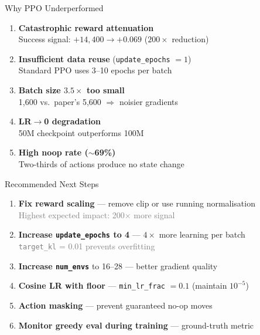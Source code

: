 \documentclass[aspectratio=169,11pt]{beamer}
\begin{document}
\begin{frame}{Why PPO Underperformed}
  \begin{enumerate}
    \item \textbf{Catastrophic reward attenuation}\\
      Success signal: $+14{,}400 \to +0.069$ ($200\times$ reduction)

    \item \textbf{Insufficient data reuse} (\texttt{update\_epochs} $= 1$)\\
      Standard PPO uses 3--10 epochs per batch

    \item \textbf{Batch size $3.5\times$ too small}\\
      1{,}600 vs.\ paper's 5{,}600 $\Rightarrow$ noisier gradients

    \item \textbf{LR$\to$0 degradation}\\
      50M checkpoint outperforms 100M

    \item \textbf{High noop rate ($\sim$69\%)}\\
      Two-thirds of actions produce no state change
  \end{enumerate}
\end{frame}

\begin{frame}{Recommended Next Steps}
  \begin{enumerate}
    \item \textcolor{accent}{\textbf{Fix reward scaling}}
      --- remove clip or use running normalisation\\
      {\small\textcolor{gray}{Highest expected impact: 200$\times$ more signal}}

    \item \textbf{Increase \texttt{update\_epochs} to 4}
      --- $4\times$ more learning per batch\\
      {\small\textcolor{gray}{\texttt{target\_kl} = 0.01 prevents overfitting}}

    \item \textbf{Increase \texttt{num\_envs}} to 16--28
      --- better gradient quality

    \item \textbf{Cosine LR with floor}
      --- \texttt{min\_lr\_frac} $= 0.1$ (maintain $10^{-5}$)

    \item \textbf{Action masking}
      --- prevent guaranteed no-op moves

    \item \textbf{Monitor greedy eval during training}
      --- ground-truth metric
  \end{enumerate}
\end{frame}
\end{document}
